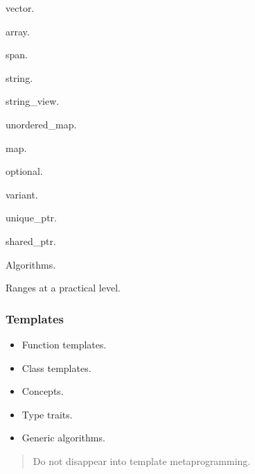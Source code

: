 \documentclass[11pt,letterpaper]{article}
\begin{document}
\begin{topics}

\item vector.

\item array.

\item span.

\item string.

\item string\_view.

\item unordered\_map.

\item map.

\item optional.

\item variant.

\item unique\_ptr.

\item shared\_ptr.

\item Algorithms.

\item Ranges at a practical level.

\end{topics}

\subsubsection*{Templates}

\begin{itemize}

\item Function templates.

\item Class templates.

\item Concepts.

\item Type traits.

\item Generic algorithms.

\end{itemize}

\begin{quote}
Do not disappear into template metaprogramming.
\end{quote}
\end{document}
